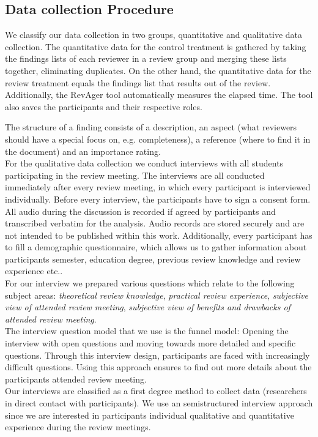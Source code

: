 \subsection{Data collection Procedure}

We classify our data collection in two groups, quantitative and qualitative data collection.
The quantitative data for the control treatment is gathered by taking the findings lists of each reviewer in a review group and merging these lists together, eliminating duplicates.
On the other hand, the quantitative data for the review treatment equals the findings list that results out of the review. Additionally, the RevAger tool automatically measures the elapsed time.
The tool also saves the participants and their respective roles.

The structure of a finding consists of a description, an aspect (what reviewers should have a special focus on, e.g. completeness), a reference (where to find it in the document) and an importance rating. \\

For the qualitative data collection we conduct interviews with all students participating in the review meeting. The interviews are all conducted immediately after every review meeting, in which every participant is interviewed individually.  Before every interview, the participants have to sign a consent form. All audio during the discussion is recorded if agreed by participants and transcribed verbatim for the analysis. Audio records are stored securely and are not intended to be published within this work. Additionally, every participant has to fill a demographic questionnaire, which allows us to gather information about participants semester, education degree, previous review knowledge and review experience etc.. \\
For our interview we prepared various questions which relate to the following subject areas: \textit{theoretical review knowledge}, \textit{practical review experience}, \textit{subjective view of attended review meeting}, \textit{subjective view of benefits and drawbacks of attended review meeting}.\\
The interview question model that we use is the funnel model: Opening the interview with open questions and moving towards more detailed and specific questions. Through this interview design, participants are faced with increasingly difficult questions.  Using this approach ensures to find out more details about the participants attended review meeting. \\
Our interviews are classified as a first degree method to collect data (researchers in direct contact with participants). We use an semistructured interview approach since we are interested in participants individual qualitative and quantitative experience during the review meetings.\\


